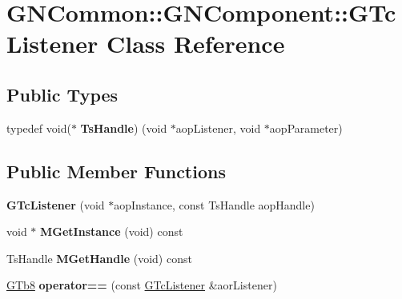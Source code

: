 \hypertarget{class_g_n_common_1_1_g_n_component_1_1_g_tc_listener}{}\section{G\+N\+Common\+:\+:G\+N\+Component\+:\+:G\+Tc\+Listener Class Reference}
\label{class_g_n_common_1_1_g_n_component_1_1_g_tc_listener}
\subsection*{Public Types}
\begin{DoxyCompactItemize}
\item 
\mbox{\label{class_g_n_common_1_1_g_n_component_1_1_g_tc_listener_adf19db174a959816cee729302eda1faf}} 
typedef void($\ast$ {\bfseries Ts\+Handle}) (void $\ast$aop\+Listener, void $\ast$aop\+Parameter)
\end{DoxyCompactItemize}
\subsection*{Public Member Functions}
\begin{DoxyCompactItemize}
\item 
\mbox{\label{class_g_n_common_1_1_g_n_component_1_1_g_tc_listener_aefc63ad4c7dc623de5c9c156848774ce}} 
{\bfseries G\+Tc\+Listener} (void $\ast$aop\+Instance, const Ts\+Handle aop\+Handle)
\item 
\mbox{\label{class_g_n_common_1_1_g_n_component_1_1_g_tc_listener_aa7b293fa2d8fb08c31b9953557ead0c8}} 
void $\ast$ {\bfseries M\+Get\+Instance} (void) const
\item 
\mbox{\label{class_g_n_common_1_1_g_n_component_1_1_g_tc_listener_a401b10e5fb60ecb19c6808ba5f758674}} 
Ts\+Handle {\bfseries M\+Get\+Handle} (void) const
\item 
\mbox{\label{class_g_n_common_1_1_g_n_component_1_1_g_tc_listener_a380b5d8f120f3848ff51857d80f5ca20}} 
\mbox{\hyperlink{namespace_g_n_common_a6b5283329f609e2175dd0c91fc1520ba}{G\+Tb8}} {\bfseries operator==} (const \mbox{\hyperlink{class_g_n_common_1_1_g_n_component_1_1_g_tc_listener}{G\+Tc\+Listener}} \&aor\+Listener)
\end{DoxyCompactItemize}
